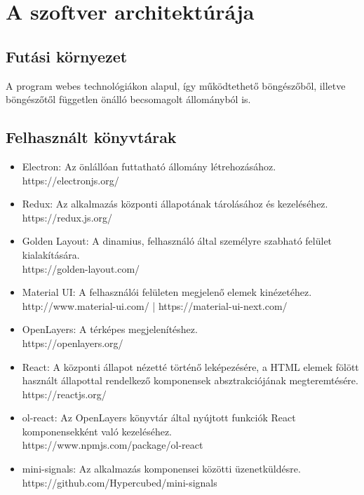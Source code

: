 \section{A szoftver architektúrája}

\subsection{Futási környezet}

A program webes technológiákon alapul, így működtethető böngészőből, illetve
böngészőtől független önálló becsomagolt állományból is.

\subsection{Felhasznált könyvtárak}

\begin{itemize}
  \item Electron: Az önlállóan futtatható állomány létrehozásához. \\
  https://electronjs.org/

  \item Redux: Az alkalmazás központi állapotának tárolásához és kezeléséhez. \\
  https://redux.js.org/

  \item Golden Layout: A dinamius, felhasználó által személyre szabható felület
  kialakítására. \\
  https://golden-layout.com/

  \item Material UI: A felhasználói felületen megjelenő elemek kinézetéhez. \\
  http://www.material-ui.com/ |  https://material-ui-next.com/

  \item OpenLayers: A térképes megjelenítéshez. \\
  https://openlayers.org/

  \item React: A központi állapot nézetté történő leképezésére, a HTML elemek
  fölött használt állapottal rendelkező komponensek absztrakciójának
  megteremtésére. \\
  https://reactjs.org/

  \item ol-react: Az OpenLayers könyvtár által nyújtott funkciók React
  komponensekként való kezeléséhez. \\
  https://www.npmjs.com/package/ol-react

  \item mini-signals: Az alkalmazás komponensei közötti üzenetküldésre. \\
  https://github.com/Hypercubed/mini-signals
\end{itemize}

